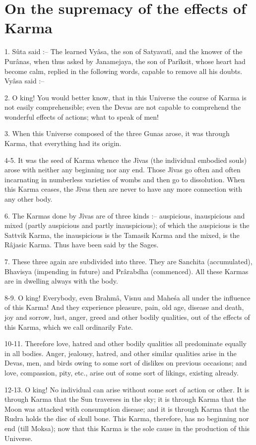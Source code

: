 ﻿\chapter{On the supremacy of the effects of Karma}

1. Sûta said :-- The learned Vy\^asa, the son of Satyavat\^i, and the knower of the Pur\^anas, when thus asked by Janamejaya, the son of Par\^iksit, whose heart had become calm, replied in the following words, capable to remove all his doubts. Vy\^asa said :--

2. O king! You would better know, that in this Universe the course of Karma is not easily comprehensible; even the Devas are not capable to comprehend the wonderful effects of actions; what to speak of men!

3. When this Universe composed of the three Gunas arose, it was through Karma, that everything had its origin.

4-5. It was the seed of Karma whence the J\^ivas (the individual embodied souls) arose with neither any beginning nor any end. Those J\^ivas go often and often incarnating in numberless varieties of wombs and then go to dissolution. When this Karma ceases, the J\^ivas then are never to have any more connection with any other body.

6. The Karmas done by J\^ivas are of three kinds :-- auspicious, inauspicious and mixed (partly auspicious and partly inauspicious); of which the auspicious is the Sattvik Karma, the inauspicious is the Tamasik Karma and the mixed, is the R\^ajasic Karma. Thus have been said by the Sages.

7. These three again are subdivided into three. They are Sanchita (accumulated), Bhavisya (impending in future) and Pr\^arabdha (commenced). All these Karmas are in dwelling always with the body.

8-9. O king! Everybody, even Brahm\^a, Visnu and Mahe\'sa all under the influence of this Karma! And they experience pleasure, pain, old age, disease and death, joy and sorrow, lust, anger, greed and other bodily qualities, out of the effects of this Karma, which we call ordinarily Fate.

10-11. Therefore love, hatred and other bodily qualities all predominate equally in all bodies. Anger, jealousy, hatred, and other similar qualities arise in the Devas, men, and birds owing to some sort of dislikes on previous occasions; and love, compassion, pity, etc., arise out of some sort of likings, existing already.

12-13. O king! No individual can arise without some sort of action or other. It is through Karma that the Sun traverses in the sky; it is through Karma that the Moon was attacked with consumption disease; and it is through Karma that the Rudra holds the disc of skull bone. This Karma, therefore, has no beginning nor end (till Moksa); now that this Karma is the sole cause in the production of this Universe.

